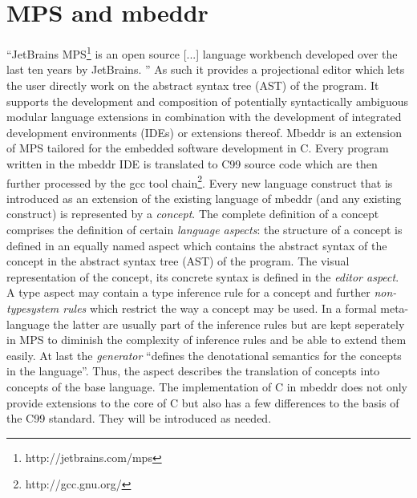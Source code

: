 \section{MPS and mbeddr}
``JetBrains MPS\footnote{http://jetbrains.com/mps} is an open source [...] language workbench developed over the last ten years by JetBrains. ''\cite{GenericTools_SpecificLanguages} As such it provides a projectional editor which lets the user directly work on the abstract syntax tree (AST) of the program\cite{LanguageWorkbenches}. It supports the development and composition of potentially syntactically ambiguous modular language extensions in combination with the development of integrated development environments (IDEs) or extensions thereof. Mbeddr is an extension of MPS tailored for the embedded software development in C. Every program written in the mbeddr IDE is translated to C99 source code which are then further processed by the gcc tool chain\footnote{http://gcc.gnu.org/}. Every new language construct that is introduced as an extension of the existing language of mbeddr (and any existing construct) is represented by a \textit{concept}. The complete definition of a concept comprises the definition of certain \textit{language aspects}: the structure of a concept is defined in an equally named aspect which contains the abstract syntax of the concept in the abstract syntax tree (AST) of the program. The visual representation of the concept, its concrete syntax is defined in the \textit{editor aspect}. A type aspect may contain a type inference rule for a concept and further \textit{non-typesystem rules} which restrict the way a concept may be used. In a formal meta-language the latter are usually part of the inference rules but are kept seperately in MPS to diminish the complexity of inference rules and be able to extend them easily. At last the \textit{generator} ``defines the denotational semantics for the concepts in the language''\cite{GeneratorUserGuide}. Thus, the aspect describes the translation of concepts into concepts of the base language.
The implementation of C in mbeddr does not only provide extensions to the core of C but also has a few differences to the basis of the C99 standard. They will be introduced as needed.

